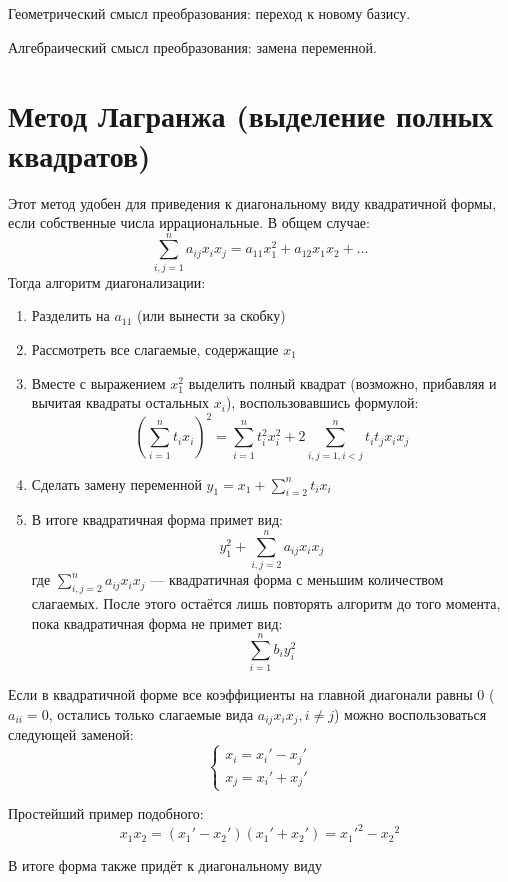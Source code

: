 \documentclass[12pt]{article}
\begin{document}
Геометрический смысл преобразования: переход к новому базису.

Алгебраический смысл преобразования: замена переменной.

\section{Метод Лагранжа (выделение полных квадратов)}
Этот метод удобен для приведения к диагональному виду квадратичной формы, если собственные числа иррациональные. В общем случае:
\[
    \sum_{i,j=1}^n a_{ij}x_ix_j = a_{11}x_1^2 + a_{12}x_1x_2 + ...
\]
Тогда алгоритм диагонализации:
\begin{enumerate}
    \item Разделить на $a_{11}$ (или вынести за скобку)
    \item Рассмотреть все слагаемые, содержащие $x_1$
    \item Вместе с выражением $x_1^2$ выделить полный квадрат (возможно, прибавляя и вычитая квадраты остальных $x_i$), воспользовавшись формулой:
          \[
              (\sum_{i = 1}^n t_ix_i)^2 = \sum_{i = 1}^nt_i^2x_i^2 + 2\sum_{i,j=1, i<j}^nt_it_jx_ix_j
          \]
    \item Сделать замену переменной $\displaystyle y_1 = x_1 + \sum_{i=2}^nt_ix_i$
    \item В итоге квадратичная форма примет вид:
          \[
              y_1^2 + \sum_{i,j=2}^na_{ij}x_ix_j
          \]
          где $\displaystyle \sum_{i,j=2}^na_{ij}x_ix_j$ — квадратичная форма с меньшим количеством слагаемых. После этого остаётся лишь повторять алгоритм до того момента, пока квадратичная форма не примет вид:
          \[
              \sum_{i=1}^nb_iy_i^2
          \]
\end{enumerate}

Если в квадратичной форме все коэффициенты на главной диагонали равны $0$ ($a_{ii} = 0$, остались только слагаемые вида $a_{ij}x_ix_j, i \neq j$) можно воспользоваться следующей заменой:
\[
    \begin{cases}
        x_i = x_i' - x_j' \\
        x_j = x_i' + x_j'
    \end{cases}
\]

Простейший пример подобного:
\[
    x_1x_2 = (x_1' - x_2')(x_1' + x_2') = {x_1'}^2 - {x_2}^2
\]

В итоге форма также придёт к диагональному виду
\end{document}
